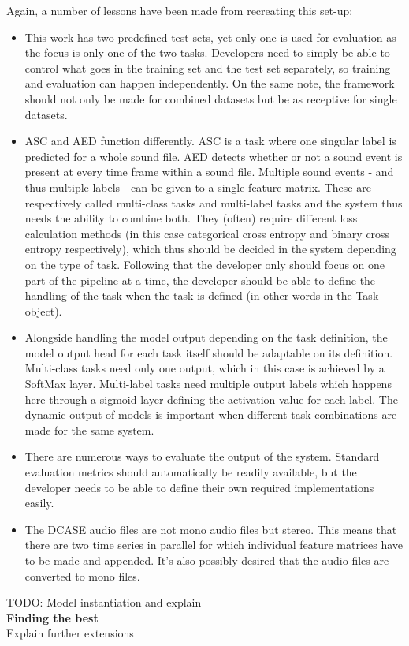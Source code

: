 Again, a number of lessons have been made from recreating this set-up:

\begin{itemize}
	\item This work has two predefined test sets, yet only one is used for evaluation as the focus is only one of the two tasks. Developers need to simply be able to control what goes in the training set and the test set separately, so training and evaluation can happen independently. On the same note, the framework should not only be made for combined datasets but be as receptive for single datasets.
	\item ASC and AED function differently. ASC is a task where one singular label is predicted for a whole sound file. AED detects whether or not a sound event is present at every time frame within a sound file. Multiple sound events - and thus multiple labels - can be given to a single feature matrix. These are respectively called multi-class tasks and multi-label tasks and the system thus needs the ability to combine both. They (often) require different loss calculation methods (in this case categorical cross entropy and binary cross entropy respectively), which thus should be decided in the system depending on the type of task. Following that the developer only should focus on one part of the pipeline at a time, the developer should be able to define the handling of the task when the task is defined (in other words in the Task object).
	\item Alongside handling the model output depending on the task definition, the model output head for each task itself should be adaptable on its definition. Multi-class tasks need only one output, which in this case is achieved by a SoftMax layer. Multi-label  tasks need multiple output labels which happens here through a sigmoid layer defining the activation value for each label. The dynamic output of models is important when different task combinations are made for the same system.
	\item There are numerous ways to evaluate the output of the system. Standard evaluation metrics should automatically be readily available, but the developer needs to be able to define their own required implementations easily. 
	\item The DCASE audio files are not mono audio files but stereo. This means that there are two time series in parallel for which individual feature matrices have to be made and appended. It's also possibly desired that the audio files are converted to mono files.
\end{itemize}

TODO: Model instantiation and explain \\

{\large \textbf{Finding the best }}\\







Explain further extensions


